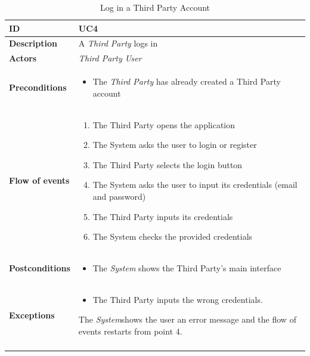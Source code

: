 \documentclass[titlepage]{article}
\begin{document}
\begin{longtable}{| p{3 cm} | p{10 cm} |} 
			\hline
			{\bf ID} & UC4 \\
			\hline
			{\bf Description} & A {\it Third Party} logs in\\
			\hline
			{\bf Actors} & {\it Third Party User} \\
			\hline
			{\bf Preconditions} & 		
							\begin{itemize}
								\item The {\it Third Party}  has already created a Third Party account 
							\end{itemize}
			\\
			\hline
			{\bf Flow of events} & 
							\begin{enumerate}
								\item The Third Party opens the application
								\item The System asks the user to login or register
								\item The Third Party selects the login button
								\item The System asks the user to input its credentials (email and password)
								\item The Third Party inputs its credentials
								\item The System checks the provided credentials

							\end{enumerate}
			
			 \\
			\hline
			{\bf Postconditions} & 
							\begin{itemize}
								\item The {\it System} shows the Third Party’s main interface
							\end{itemize}
			\\
			\hline
			{\bf Exceptions} & 
							\begin{itemize}
								\item The Third Party inputs the wrong credentials. 
							\end{itemize}
							The {\it System}shows the user an error message and the flow of events 							restarts from point 4.
							
			\\
			\hline
			\caption{Log in a Third Party Account}
			\end{longtable}
\end{document}
